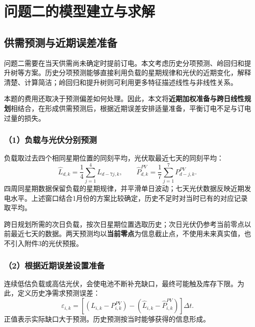 \section{问题二的模型建立与求解}
\subsection{供需预测与近期误差准备}
问题二需要在当天供需尚未确定时提前订电。本文考虑历史分项预测、岭回归和提升树等方案。历史分项预测能够直接利用负载的星期规律和光伏的近期变化，解释清楚、计算简洁；岭回归和提升树则可利用更多特征描述线性与非线性关系。

本题的费用还取决于预测偏差如何处理。因此，本文将\textbf{近期加权准备与跨日线性规划}相结合，在形成供需预测后，根据近期误差安排适量准备，平衡订电不足与订电过量的损失。

\subsubsection*{（1）负载与光伏分别预测}
负载取过去四个相同星期位置的同刻平均，光伏取最近七天的同刻平均：
\begin{equation}
\widehat L_{d,k}=\frac14\sum_{j=1}^{4}L_{d-7j,k},\qquad
\widehat P^{PV}_{d,k}=\frac17\sum_{j=1}^{7}P^{PV}_{d-j,k}.
\label{eq:q2_forecast}
\end{equation}
四周同星期数据保留负载的星期规律，并平滑单日波动；七天光伏数据反映近期发电水平。上述窗口结合1月份的方案比较确定，历史不足时对当时已有的对应记录取平均。

跨日规划所需的次日负载，按次日星期位置选取历史；次日光伏仍参考当前零点以前最近七天的数据。两天预测均以\textbf{当前零点}为信息截止点，不使用未来真实值，也不引入附件3的光伏预报。

\subsubsection*{（2）根据近期误差设置准备}
连续低估负载或高估光伏，会使电池不断补充缺口，最终可能触及库存下限。为此，定义历史净需求预测误差：
\begin{equation}
\varepsilon_{i,k}=\left[(L_{i,k}-P^{PV}_{i,k})-(\widehat L_{i,k}-\widehat P^{PV}_{i,k})\right]\Delta t.
\label{eq:q2_error}
\end{equation}
正值表示实际缺口大于预测。历史预测按当时能够获得的信息形成。

